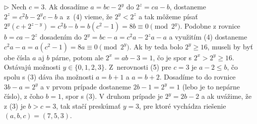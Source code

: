 {\item{$\triangleright$} Nech $c=3$.
Ak dosadíme $a=bc-2^y$ do $2^z={ca-b}$, dostaneme $2^z={c^2b-2^yc-b}$ a~z~(4) vieme, že $2^y<2^z$ a tak môžeme písať $2^y(c+2^{z-y})={c^2b-b}=b({c^2-1})=8b\equiv 0\pmod {2^y}$. Podobne z rovnice $b=ca-2^z$ dosadením do $2^y={bc-a}={c^2a-2^za-a}$ a využitím (4) dostaneme ${c^2a-a}={a(c^2-1)}=8a\equiv 0\pmod {2^y}$. Ak by teda bolo $2^y\ge 16$, museli by byť obe čísla $a$ aj $b$ párne, potom ale $2^x={ab-3}=1$, čo je spor s $2^x>2^y\ge 16$. Ostávajú možnosti $y\in\{0,1,2,3\}$. Z~nerovnosti (5) pre $c=3$ je $a-2\le b$, čo spolu s (3) dáva iba možnosti $a=b+1$ a $a=b+2$. Dosadíme to do rovnice $3b-a=2^y$ a v prvom prípade dostaneme $2b-1=2^y=1$ (lebo je to nepárne číslo), z čoho $b=1$, spor s (3). V druhom prípade je $2^y=2b-2$ a ak uvážime, že z (3) je $b>c=3$, tak stačí preskúmať $y=3$, pre ktoré vychádza riešenie $(a,b,c)=(7,5,3)$.

}
